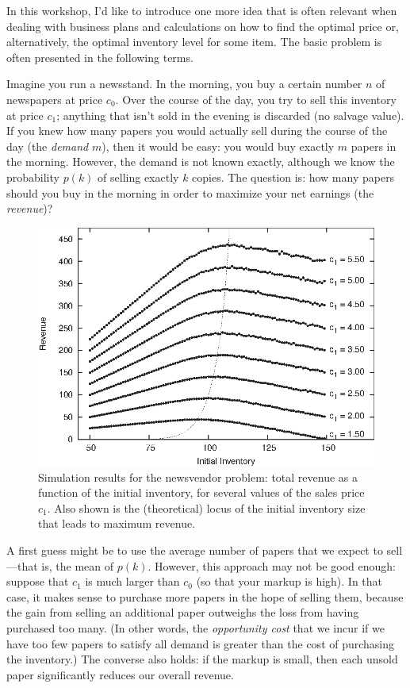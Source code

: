  
In this workshop, I'd like to introduce one more idea that is often
relevant when dealing with business plans and calculations on how to find
the optimal price or, alternatively, the optimal inventory level for
some item. The basic problem is often presented in the following
terms.

Imagine you run a newsstand. In the morning, you buy a certain number
$n$ of newspapers at price $c_0$. Over the course of the day, you try
to sell this inventory at price $c_1$; anything that isn't sold in the
evening is discarded (no salvage value). If you knew how many papers
you would actually sell during the course of the day (the
\emph{demand} $m$), then it would be easy: you would buy exactly $m$
papers in the morning. However, the demand is not known exactly,
although we know the probability $p(k)$ of selling exactly $k$ copies.
The question is: how many papers should you buy in the morning in
order to maximize your net earnings (the \emph{revenue})?

\begin{figure}
  \centerline{\includegraphics{img/newsboy}}
  \caption{Simulation results for the newsvendor problem: total
    revenue as a function of the initial inventory, for several values
    of the sales price $c_1$. Also shown is the (theoretical) locus of
    the initial inventory size that leads to maximum revenue.  \label{fig:newsboy}}\vspace*{-9pt}
\end{figure}

A first guess might be to use the average number of papers that we
expect to sell---that is, the mean of $p(k)$. However, this approach
may not be good enough: suppose that $c_1$ is much larger than $c_0$
(so that your markup is high). In that case, it makes sense to purchase
more papers in the hope of selling them, because\vadjust{\pagebreak}  the gain from selling
an additional paper outweighs the loss from having purchased too many.
(In other words, the \emph{opportunity cost} that we incur if we have
too few papers to satisfy all demand is greater than the cost of
purchasing the inventory.) The converse also holds: if the markup is
small, then each unsold paper significantly reduces our overall
revenue.

